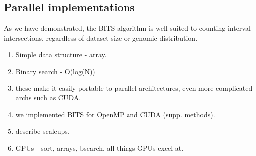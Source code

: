 \documentclass{bioinfo}
\begin{document}
	\subsection{Parallel implementations}
	
	As we have demonstrated, the BITS algorithm is well-suited to counting
	interval intersections, regardless of dataset size or genomic distribution.
	
	\begin{enumerate}
		\item Simple data structure - array.
		\item Binary search - O(log(N))
		\item these make it easily portable to parallel architectures, even 
		      more complicated archs such as CUDA.
		\item we implemented BITS for OpenMP and CUDA (supp. methods).
		\item describe scaleups.
		\item GPUs - sort, arrays, bsearch.  all things GPUs excel at.
		

\end{enumerate}
\end{document}
